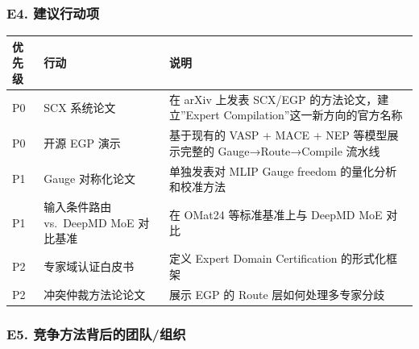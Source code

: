 \documentclass[
  12pt,
]{ctexart}
\begin{document}
\subsubsection{E4. 建议行动项}\label{e4.-ux5efaux8baeux884cux52a8ux9879}

\begin{longtable}[]{@{}
  >{\centering\arraybackslash}p{}
  >{\raggedright\arraybackslash}p{}
  >{\raggedright\arraybackslash}p{}@{}}
\toprule\noalign{}
\begin{minipage}[b]{\linewidth}\centering
优先级
\end{minipage} & \begin{minipage}[b]{\linewidth}\raggedright
行动
\end{minipage} & \begin{minipage}[b]{\linewidth}\raggedright
说明
\end{minipage} \\
\midrule\noalign{}
\endhead
\bottomrule\noalign{}
\endlastfoot
P0 & SCX 系统论文 & 在 arXiv 上发表 SCX/EGP 的方法论文，建立''Expert
Compilation''这一新方向的官方名称 \\
P0 & 开源 EGP 演示 & 基于现有的 VASP + MACE + NEP 等模型展示完整的
Gauge→Route→Compile 流水线 \\
P1 & Gauge 对称化论文 & 单独发表对 MLIP Gauge freedom
的量化分析和校准方法 \\
P1 & 输入条件路由 vs.~DeepMD MoE 对比基准 & 在 OMat24 等标准基准上与
DeepMD MoE 对比 \\
P2 & 专家域认证白皮书 & 定义 Expert Domain Certification 的形式化框架 \\
P2 & 冲突仲裁方法论论文 & 展示 EGP 的 Route 层如何处理多专家分歧 \\
\end{longtable}

\subsubsection{E5.
竞争方法背后的团队/组织}\label{e5.-ux7adeux4e89ux65b9ux6cd5ux80ccux540eux7684ux56e2ux961fux7ec4ux7ec7}
\end{document}
